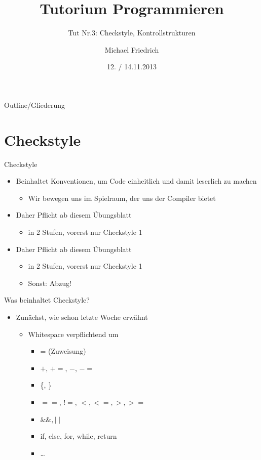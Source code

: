 \documentclass[18pt]{beamer}
\title[Prog Tut Nr. 3]{Tutorium Programmieren}
\subtitle{Tut Nr.3: Checkstyle, Kontrollstrukturen}
\author{Michael Friedrich}
\date{12. / 14.11.2013}
\institute{Institut f\"ur theoretische Informatik}
\begin{document}

\begin{frame}
	\titlepage
\end{frame}

\begin{frame}{Outline/Gliederung}
	\tableofcontents
\end{frame}

\section{Checkstyle}
\begin{frame}[fragile]{Checkstyle}
\begin{itemize}

	\item Beinhaltet Konventionen, um Code einheitlich und
	damit leserlich zu machen
	\begin{itemize}
	\item Wir bewegen uns im Spielraum, der uns der Compiler bietet
	\end{itemize}
	
	\item Daher Pflicht ab diesem Übungsblatt
	\begin{itemize}
	\item in 2 Stufen, vorerst nur Checkstyle 1
	\end{itemize}
	
	\item Daher Pflicht ab diesem Übungsblatt
	\begin{itemize}
	\item in 2 Stufen, vorerst nur Checkstyle 1
	\item Sonst: Abzug!
	\end{itemize}
	
\end{itemize}
\end{frame}

\begin{frame}[fragile]{Was beinhaltet Checkstyle?}
\begin{itemize}

	\item Zunächst, wie schon letzte Woche erwähnt
	\begin{itemize}
			\item Whitespace verpflichtend um
				\begin{itemize}
				\item = (Zuweisung)
				\item $+$, $+=$, $-$, $-=$
				\item \{, \}
				\item $==$, !$=$, $<, <=, >, >=$
				\item $\&\&, \mid\mid $
				\item if, else, for, while, return
				\item \ldots
				\end{itemize}
	\end{itemize}
\end{itemize}	
\end{frame}
\end{document}
